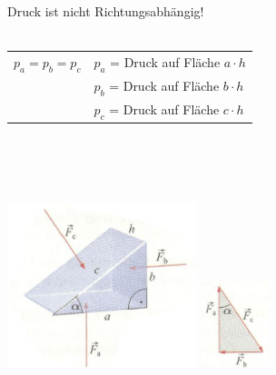 		\newline
		\newline
		\newline
		\newline
		\begin{minipage}[t]{11.5cm}
				\newline
				Druck ist nicht Richtungsabhängig!\\ \\
				\renewcommand{\arraystretch}{1.5}
				\begin{tabular}{ p{4cm} p{7cm}}
					$p_a = p_b = p_c$	&	$p_a$ = Druck auf Fläche $a \cdot h$\\
					&	$p_b$ = Druck auf Fläche $b \cdot h$\\
					&	$p_c$ = Druck auf Fläche $c\cdot h$\\
				\end{tabular}\\ \\ \\
		\end{minipage}
		\begin{minipage}[t]{10cm}
			\vspace{-\ht\strutbox}\includegraphics[width=5.5cm]{./bilder/GesetzVonPascal1.jpg}
			\vspace{-\ht\strutbox}\includegraphics[width=2cm]{./bilder/GesetzVonPascal2.jpg}
		\end{minipage}
	\newpage
